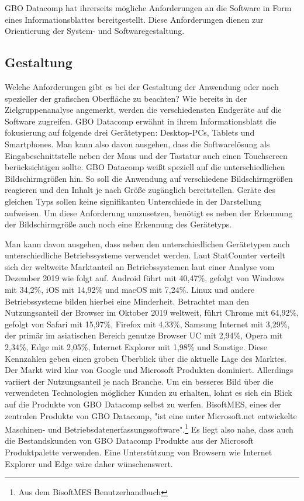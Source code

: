 GBO Datacomp hat ihrerseits mögliche Anforderungen an die Software in Form eines Informationsblattes
bereitgestellt. Diese Anforderungen dienen zur Orientierung der System- und Softwaregestaltung. 

\subsection{Gestaltung}
Welche Anforderungen gibt es bei der Gestaltung der Anwendung oder noch spezieller 
der grafischen Oberfläche zu beachten? Wie bereits in der Zielgruppenanalyse
angemerkt, werden die verschiedensten Endgeräte auf die Software zugreifen.
GBO Datacomp erwähnt in ihrem Informationsblatt die fokusierung auf folgende
drei Gerätetypen: Desktop-PCs, Tablets und Smartphones. Man kann also davon ausgehen, dass die
Softwarelösung als Eingabeschnittstelle neben der Maus und der Tastatur auch einen Touchscreen
berücksichtigen sollte. GBO Datacomp weißt speziell auf die unterschiedlichen Bildschirmgrößen
hin. So soll die Anwendung auf verschiedene Bildschirmgrößen reagieren und den Inhalt je nach
Größe zugänglich bereitstellen. Geräte des gleichen Typs sollen keine signifikanten Unterschiede
in der Darstellung aufweisen. Um diese Anforderung umzusetzen, benötigt es neben der Erkennung
der Bildschirmgröße auch noch eine Erkennung des Gerätetyps.

Man kann davon ausgehen, dass neben den unterschiedlichen Gerätetypen auch unterschiedliche
Betriebssysteme verwendet werden. Laut StatCounter verteilt sich der weltweite Marktanteil
an Betriebssystemen laut einer Analyse vom Dezember 2019 wie folgt auf. Android führt mit
40,47\%, gefolgt von Windows mit 34,2\%, iOS mit 14,92\% und macOS mit 7,24\%. Linux und andere
Betriebssysteme bilden hierbei eine Minderheit.\cite{StatCounterOSMarketShare} Betrachtet man den
Nutzungsanteil der Browser im Oktober 2019 weltweit, führt Chrome mit 64,92\%, gefolgt von Safari mit 15,97\%,
Firefox mit 4,33\%, Samsung Internet mit 3,29\%, der primär im asiatischen Bereich genutze Browser UC
mit 2,94\%, Opera mit 2,34\%, Edge mit 2,05\%, Internet Explorer mit 1,98\% und Sonstige.\cite{StatCounterBrowserMarketShare}
Diese Kennzahlen geben einen groben Überblick über die aktuelle Lage des Marktes. Der Markt wird klar von
Google und Microsoft Produkten dominiert. Allerdings variiert der Nutzungsanteil je nach Branche.
Um ein besseres Bild über die verwendeten Technologien möglicher Kunden zu erhalten,
lohnt es sich ein Blick auf die Produkte von GBO Datacomp selbst zu werfen.
BisoftMES, eines der zentralen Produkte von GBO Datacomp, "ist eine unter Microsoft.net
entwickelte Maschinen- und Betriebsdatenerfassungssoftware".\footnote[1]{Aus dem BisoftMES Benutzerhandbuch\cite[S. 7]{BisoftMESHandbuch}}
Es liegt also nahe, dass auch die Bestandskunden von GBO Datacomp Produkte aus der Microsoft
Produktpalette verwenden. Eine Unterstützung von Browsern wie Internet Explorer und Edge
wäre daher wünschenswert.

